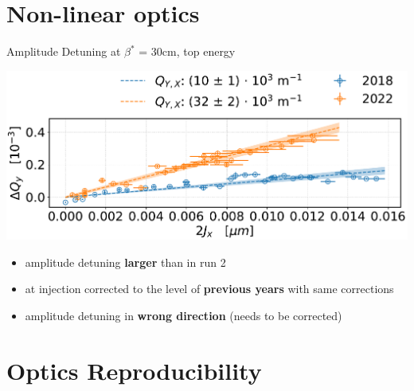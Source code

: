 \documentclass[4pt,usenames,dvipsnames,aspectratio=169,table]{beamer}
\newcommand{\highl}[1]{\textbf{#1}}
\begin{document}
%    
%
%
\section{Non-linear optics}

\begin{frame}{Amplitude Detuning at $\beta^*$ = 30cm, top energy}
    \begin{center}
        \includegraphics[width=0.5\linewidth]{images/nonlinear/comparison_2018_2022_dQYd2JX_corrected.pdf}
    \end{center}
    
    \begin{itemize}
        \item amplitude detuning \highl{larger} than in run 2
        \item at injection corrected to the level of \highl{previous years} with same corrections
        \item amplitude detuning in \highl{wrong direction} (needs to be corrected)
    \end{itemize}
\end{frame}


\section{Optics Reproducibility}
\end{document}
